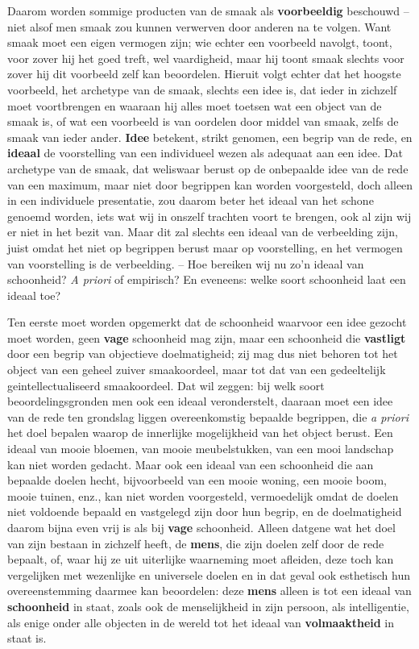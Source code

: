 Daarom worden sommige producten van de smaak als \textbf{voorbeeldig} beschouwd – niet alsof men smaak zou kunnen verwerven door anderen na te volgen. Want smaak moet een eigen vermogen zijn; wie echter een voorbeeld navolgt, toont, voor zover hij het goed treft, wel vaardigheid, maar hij toont smaak slechts voor zover hij dit voorbeeld zelf kan beoordelen. Hieruit volgt echter dat het hoogste voorbeeld, het archetype van de smaak, slechts een idee is, dat ieder in zichzelf moet voortbrengen en waaraan hij alles moet toetsen wat een object van de smaak is, of wat een voorbeeld is van oordelen door middel van smaak, zelfs de smaak van ieder ander. \textbf{Idee} betekent, strikt genomen, een begrip van de rede, en \textbf{ideaal} de voorstelling van een individueel wezen als adequaat aan een idee. Dat archetype van de smaak, dat weliswaar berust op de onbepaalde idee van de rede van een maximum, maar niet door begrippen kan worden voorgesteld, doch alleen in een individuele presentatie, zou daarom beter het ideaal van het schone genoemd worden, iets wat wij in onszelf trachten voort te brengen, ook al zijn wij er niet in het bezit van. Maar dit zal slechts een ideaal van de verbeelding zijn, juist omdat het niet op begrippen berust maar op voorstelling, en het vermogen van voorstelling is de verbeelding. – Hoe bereiken wij nu zo’n ideaal van schoonheid? \emph{A priori} of empirisch? En eveneens: welke soort schoonheid laat een ideaal toe?

Ten eerste moet worden opgemerkt dat de schoonheid waarvoor een idee gezocht moet worden, geen \textbf{vage} schoonheid mag zijn, maar een schoonheid die \textbf{vastligt} door een begrip van objectieve doelmatigheid; zij mag dus niet behoren tot het object van een geheel zuiver smaak­oordeel, maar tot dat van een gedeeltelijk geintellectualiseerd smaak­oordeel. Dat wil zeggen: bij welk soort beoordelingsgronden men ook een ideaal veronderstelt, daaraan moet een idee van de rede ten grondslag liggen overeenkomstig bepaalde begrippen, die \emph{a priori} het doel bepalen waarop de innerlijke mogelijkheid van het object berust. Een ideaal van mooie bloemen, van mooie meubelstukken, van een mooi landschap kan niet worden gedacht. Maar ook een ideaal van een schoonheid die aan bepaalde doelen hecht, bijvoorbeeld van een mooie woning, een mooie boom, mooie tuinen, enz., kan niet worden voorgesteld, vermoedelijk omdat de doelen niet voldoende bepaald en vastgelegd zijn door hun begrip, en de doelmatigheid daarom bijna even vrij is als bij \textbf{vage} schoonheid. Alleen datgene wat het doel van zijn bestaan in zichzelf heeft, de \textbf{mens}, die zijn doelen zelf door de rede bepaalt, of, waar hij ze uit uiterlijke waarneming moet afleiden, deze toch kan vergelijken met wezenlijke en universele doelen en in dat geval ook esthetisch hun overeenstemming daarmee kan beoordelen: deze \textbf{mens} alleen is tot een ideaal van \textbf{schoonheid} in staat, zoals ook de menselijkheid in zijn persoon, als intelligentie, als enige onder alle objecten in de wereld tot het ideaal van \textbf{volmaaktheid} in staat is.

